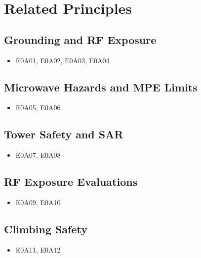 \documentclass{book}
\begin{document}
\section{Related Principles}
\subsection{Grounding and RF Exposure}
\begin{itemize}
    \item E0A01, E0A02, E0A03, E0A04
\end{itemize}
\subsection{Microwave Hazards and MPE Limits}
\begin{itemize}
    \item E0A05, E0A06
\end{itemize}
\subsection{Tower Safety and SAR}
\begin{itemize}
    \item E0A07, E0A08
\end{itemize}
\subsection{RF Exposure Evaluations}
\begin{itemize}
    \item E0A09, E0A10
\end{itemize}
\subsection{Climbing Safety}
\begin{itemize}
    \item E0A11, E0A12
\end{itemize}
\end{document}
